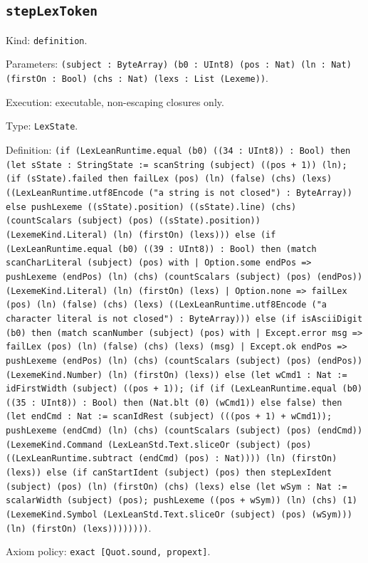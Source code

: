 \documentclass[11pt]{article}
\begin{document}
\subsection*{\texttt{stepLexToken}}
\noindent Kind: \texttt{definition}.\par
\noindent Parameters: \texttt{(subject : ByteArray) (b0 : UInt8) (pos : Nat) (ln : Nat) (firstOn : Bool) (chs : Nat) (lexs : List (Lexeme))}.\par
\noindent Execution: executable, non-escaping closures only.\par
\noindent Type: \texttt{LexState}.\par
\noindent Definition: \texttt{(if (LexLeanRuntime.equal (b0) ((34 : UInt8)) : Bool) then (let sState : StringState := scanString (subject) ((pos + 1)) (ln); (if (sState).failed then failLex (pos) (ln) (false) (chs) (lexs) ((LexLeanRuntime.utf8Encode ("a string is not closed") : ByteArray)) else pushLexeme ((sState).position) ((sState).line) (chs) (countScalars (subject) (pos) ((sState).position)) (LexemeKind.Literal) (ln) (firstOn) (lexs))) else (if (LexLeanRuntime.equal (b0) ((39 : UInt8)) : Bool) then (match scanCharLiteral (subject) (pos) with | Option.some endPos => pushLexeme (endPos) (ln) (chs) (countScalars (subject) (pos) (endPos)) (LexemeKind.Literal) (ln) (firstOn) (lexs) | Option.none => failLex (pos) (ln) (false) (chs) (lexs) ((LexLeanRuntime.utf8Encode ("a character literal is not closed") : ByteArray))) else (if isAsciiDigit (b0) then (match scanNumber (subject) (pos) with | Except.error msg => failLex (pos) (ln) (false) (chs) (lexs) (msg) | Except.ok endPos => pushLexeme (endPos) (ln) (chs) (countScalars (subject) (pos) (endPos)) (LexemeKind.Number) (ln) (firstOn) (lexs)) else (let wCmd1 : Nat := idFirstWidth (subject) ((pos + 1)); (if (if (LexLeanRuntime.equal (b0) ((35 : UInt8)) : Bool) then (Nat.blt (0) (wCmd1)) else false) then (let endCmd : Nat := scanIdRest (subject) (((pos + 1) + wCmd1)); pushLexeme (endCmd) (ln) (chs) (countScalars (subject) (pos) (endCmd)) (LexemeKind.Command (LexLeanStd.Text.sliceOr (subject) (pos) ((LexLeanRuntime.subtract (endCmd) (pos) : Nat)))) (ln) (firstOn) (lexs)) else (if canStartIdent (subject) (pos) then stepLexIdent (subject) (pos) (ln) (firstOn) (chs) (lexs) else (let wSym : Nat := scalarWidth (subject) (pos); pushLexeme ((pos + wSym)) (ln) (chs) (1) (LexemeKind.Symbol (LexLeanStd.Text.sliceOr (subject) (pos) (wSym))) (ln) (firstOn) (lexs))))))))}.\par
\noindent Axiom policy: \texttt{exact [Quot.sound, propext]}.\par
\end{document}
